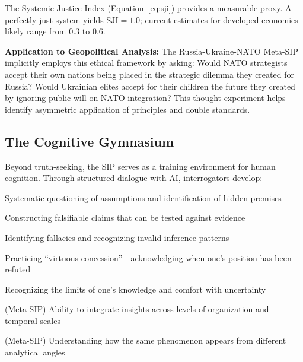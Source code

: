 \documentclass[11pt,a4paper]{article}
\begin{document}
The Systemic Justice Index (Equation~\ref{eq:sji}) provides a measurable proxy. A perfectly just system yields $\text{SJI} = 1.0$; current estimates for developed economies likely range from $0.3$ to $0.6$.

\textbf{Application to Geopolitical Analysis:} The Russia-Ukraine-NATO Meta-SIP implicitly employs this ethical framework by asking: Would NATO strategists accept their own nations being placed in the strategic dilemma they created for Russia? Would Ukrainian elites accept for their children the future they created by ignoring public will on NATO integration? This thought experiment helps identify asymmetric application of principles and double standards.

\subsection{The Cognitive Gymnasium}

Beyond truth-seeking, the SIP serves as a training environment for human cognition. Through structured dialogue with AI, interrogators develop:

\begin{description}[style=nextline]
\item[\textbf{Critical Thinking}] Systematic questioning of assumptions and identification of hidden premises

\item[\textbf{Hypothesis Formation}] Constructing falsifiable claims that can be tested against evidence

\item[\textbf{Logical Rigor}] Identifying fallacies and recognizing invalid inference patterns

\item[\textbf{Intellectual Honesty}] Practicing ``virtuous concession''---acknowledging when one's position has been refuted

\item[\textbf{Epistemic Humility}] Recognizing the limits of one's knowledge and comfort with uncertainty

\item[\textbf{Multi-Scale Thinking}] (Meta-SIP) Ability to integrate insights across levels of organization and temporal scales

\item[\textbf{Perspective-Taking}] (Meta-SIP) Understanding how the same phenomenon appears from different analytical angles
\end{description}
\end{document}
